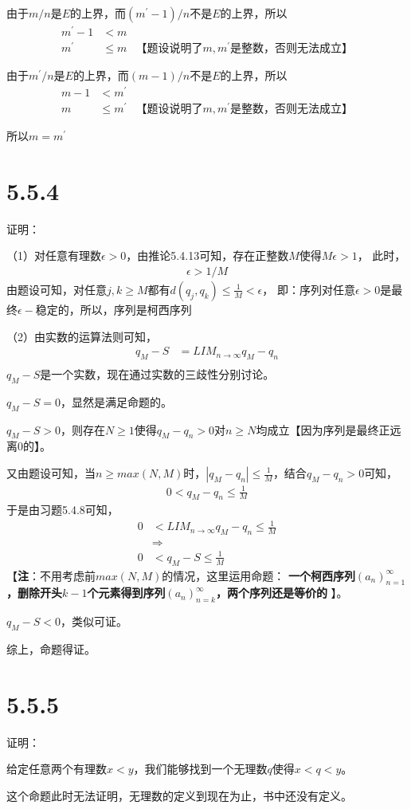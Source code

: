 \documentclass{article}
\theoremstyle{mystyle}
\begin{document}
  由于$m/n$是$E$的上界，而$(m^\prime -1)/n$不是$E$的上界，所以
  \begin{align*}
    m^\prime -1 & < m                                           \\
    m^\prime    & \leq m & \text{【题设说明了$m,m^\prime$是整数，否则无法成立】}
  \end{align*}

  由于$m^\prime/n$是$E$的上界，而$(m -1)/n$不是$E$的上界，所以
  \begin{align*}
    m - 1 & < m^\prime                                           \\
    m     & \leq m^\prime & \text{【题设说明了$m,m^\prime$是整数，否则无法成立】}
  \end{align*}

  所以$m = m^\prime$

  \section*{5.5.4}

  证明：

  （1）对任意有理数$\epsilon > 0$，由推论5.4.13可知，存在正整数$M$使得$M\epsilon > 1$，
  此时，
  \begin{align*}
    \epsilon > 1/M
  \end{align*}
  由题设可知，对任意$j,k \geq M$都有$d(q_j,q_k) \leq \frac{1}{M} < \epsilon$，
  即：序列对任意$\epsilon > 0$是最终$\epsilon -$稳定的，所以，序列是柯西序列

  （2）由实数的运算法则可知，
  \begin{align*}
    q_M - S & = LIM_{n\rightarrow \infty}q_M - q_n \\
  \end{align*}
$q_M - S$是一个实数，现在通过实数的三歧性分别讨论。

$q_M - S = 0$，显然是满足命题的。

$q_M - S > 0$，则存在$N \geq 1$使得$q_M - q_n > 0$对$n \geq N$均成立【因为序列是最终正远离0的】。

  又由题设可知，当$n \geq max(N, M)$时，$|q_M - q_n| \leq \frac{1}{M}$，结合$q_M - q_n > 0$可知，
  \begin{align*}
    0 < q_M - q_n \leq \frac{1}{M}
  \end{align*}
  于是由习题5.4.8可知，
  \begin{align*}
    0 & < LIM_{n\rightarrow \infty}q_M - q_n  \leq \frac{1}{M} \\
      & \Rightarrow                                            \\
    0 & < q_M - S                             \leq \frac{1}{M}
  \end{align*}
  【\textbf{注}：不用考虑前$max(N,M)$的情况，这里运用命题：
  \textbf{一个柯西序列$(a_n)_{n=1}^\infty$，删除开头$k-1$个元素得到序列$(a_n)_{n=k}^\infty$，两个序列还是等价的} 】。

$q_M - S < 0$，类似可证。

  综上，命题得证。

  \section*{5.5.5}

  证明：

  给定任意两个有理数$x < y$，我们能够找到一个无理数$q$使得$x < q < y$。

这个命题此时无法证明，无理数的定义到现在为止，书中还没有定义。
\end{document}

